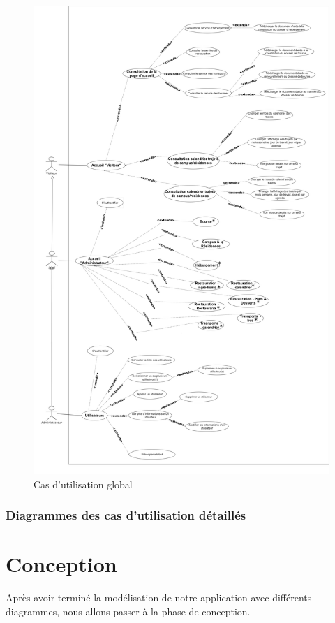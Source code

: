 \begin{figure}[H]
    \centering
    \includegraphics[scale=0.1]{ACR/Diagrammes/Global (1).jpg}
    \caption{Cas d'utilisation global}
\end{figure}

\subsubsection{Diagrammes des cas d’utilisation détaillés}


\section{Conception}
Après avoir terminé la modélisation de notre application avec différents diagrammes, nous allons passer à la phase de conception.\\

